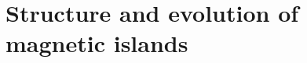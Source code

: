 %
% 
%
% 

\section{Structure and evolution of magnetic islands}
\label{sec:reconnection-plasmoids}

\begin{figure}[htb]
\end{figure}
